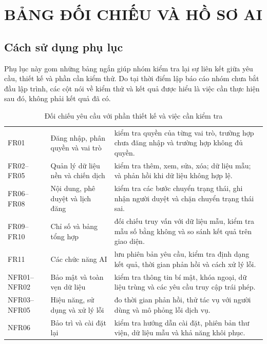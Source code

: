 \appendix
\renewcommand{\chaptername}{Phụ lục}
\chapter{BẢNG ĐỐI CHIẾU VÀ HỒ SƠ AI}

\section{Cách sử dụng phụ lục}

Phụ lục này gom những bảng ngắn giúp nhóm kiểm tra lại sự liên kết giữa yêu cầu, thiết kế và phần cần kiểm thử. Do tại thời điểm lập báo cáo nhóm chưa bắt đầu lập trình, các cột nói về kiểm thử và kết quả được hiểu là việc cần thực hiện sau đó, không phải kết quả đã có.

\begin{table}[!htbp]
\centering
\small
\renewcommand{\arraystretch}{1.15}
\caption{Đối chiếu yêu cầu với phần thiết kế và việc cần kiểm tra}\label{tab:v8-traceability}
\begin{tabularx}{\textwidth}{|C{2.6cm}|L{3.8cm}|Y|}
\hline
{} &  & \\
\hline
FR01 & Đăng nhập, phân quyền và vai trò & kiểm tra quyền của từng vai trò, trường hợp chưa đăng nhập và trường hợp không đủ quyền.\\
\hline
FR02--FR05 & Quản lý dữ liệu nền và chiến dịch & kiểm tra thêm, xem, sửa, xóa; dữ liệu mẫu; và phản hồi khi dữ liệu không hợp lệ.\\
\hline
FR06--FR08 & Nội dung, phê duyệt và lịch đăng & kiểm tra các bước chuyển trạng thái, ghi nhận người duyệt và chặn chuyển trạng thái sai.\\
\hline
FR09--FR10 & Chỉ số và bảng tổng hợp & đối chiếu truy vấn với dữ liệu mẫu, kiểm tra mẫu số bằng không và so sánh kết quả trên giao diện.\\
\hline
FR11 & Các chức năng AI & lưu phiên bản yêu cầu, kiểm tra định dạng kết quả, thời gian phản hồi và cách xử lý lỗi.\\
\hline
NFR01--NFR02 & Bảo mật và toàn vẹn dữ liệu & kiểm tra thông tin bí mật, khóa ngoại, dữ liệu trùng và các yêu cầu truy cập trái phép.\\
\hline
NFR03--NFR05 & Hiệu năng, sử dụng và xử lý lỗi & đo thời gian phản hồi, thử tác vụ với người dùng và mô phỏng lỗi dịch vụ.\\
\hline
NFR06 & Bảo trì và cài đặt lại & kiểm tra hướng dẫn cài đặt, phiên bản thư viện, dữ liệu mẫu và khả năng khôi phục.\\
\hline
\end{tabularx}
\end{table}

